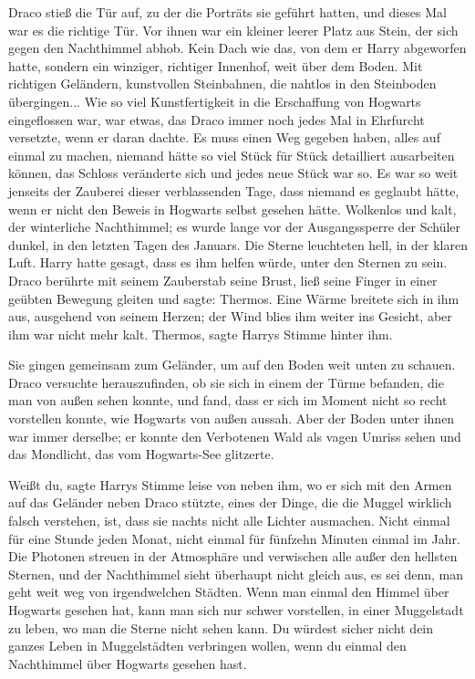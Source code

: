 Draco stieß die Tür auf, zu der die Porträts sie geführt hatten, und dieses Mal
war es die richtige Tür. Vor ihnen war ein kleiner leerer Platz aus Stein, der
sich gegen den Nachthimmel abhob. Kein Dach wie das, von dem er Harry abgeworfen
hatte, sondern ein winziger, richtiger Innenhof, weit über dem Boden. Mit
richtigen Geländern, kunstvollen Steinbahnen, die nahtlos in den Steinboden
übergingen... Wie so viel Kunstfertigkeit in die Erschaffung von Hogwarts
eingeflossen war, war etwas, das Draco immer noch jedes Mal in Ehrfurcht
versetzte, wenn er daran dachte. Es muss einen Weg gegeben haben, alles auf
einmal zu machen, niemand hätte so viel Stück für Stück detailliert ausarbeiten
können, das Schloss veränderte sich und jedes neue Stück war so. Es war so weit
jenseits der Zauberei dieser verblassenden Tage, dass niemand es geglaubt hätte,
wenn er nicht den Beweis in Hogwarts selbst gesehen hätte. Wolkenlos und kalt,
der winterliche Nachthimmel; es wurde lange vor der Ausgangssperre der Schüler
dunkel, in den letzten Tagen des Januars. Die Sterne leuchteten hell, in der
klaren Luft. Harry hatte gesagt, dass es ihm helfen würde, unter den Sternen zu
sein. Draco berührte mit seinem Zauberstab seine Brust, ließ seine Finger in
einer geübten Bewegung gleiten und sagte: \glqq{}Thermos.\grqq{} Eine Wärme
breitete sich in ihm aus, ausgehend von seinem Herzen; der Wind blies ihm weiter
ins Gesicht, aber ihm war nicht mehr kalt. \glqq{}Thermos\grqq{}, sagte Harrys
Stimme hinter ihm.

Sie gingen gemeinsam zum Geländer, um auf den Boden weit unten zu schauen. Draco
versuchte herauszufinden, ob sie sich in einem der Türme befanden, die man von
außen sehen konnte, und fand, dass er sich im Moment nicht so recht vorstellen
konnte, wie Hogwarts von außen aussah. Aber der Boden unter ihnen war immer
derselbe; er konnte den Verbotenen Wald als vagen Umriss sehen und das
Mondlicht, das vom Hogwarts-See glitzerte.

\glqq{}Weißt du\grqq{}, sagte Harrys Stimme leise von neben ihm, wo er sich mit
den Armen auf das Geländer neben Draco stützte, \glqq{}eines der Dinge, die die
Muggel wirklich falsch verstehen, ist, dass sie nachts nicht alle Lichter
ausmachen. Nicht einmal für eine Stunde jeden Monat, nicht einmal für fünfzehn
Minuten einmal im Jahr. Die Photonen streuen in der Atmosphäre und verwischen
alle außer den hellsten Sternen, und der Nachthimmel sieht überhaupt nicht
gleich aus, es sei denn, man geht weit weg von irgendwelchen Städten. Wenn man
einmal den Himmel über Hogwarts gesehen hat, kann man sich nur schwer
vorstellen, in einer Muggelstadt zu leben, wo man die Sterne nicht sehen kann.
Du würdest sicher nicht dein ganzes Leben in Muggelstädten verbringen wollen,
wenn du einmal den Nachthimmel über Hogwarts gesehen hast.\grqq{}

